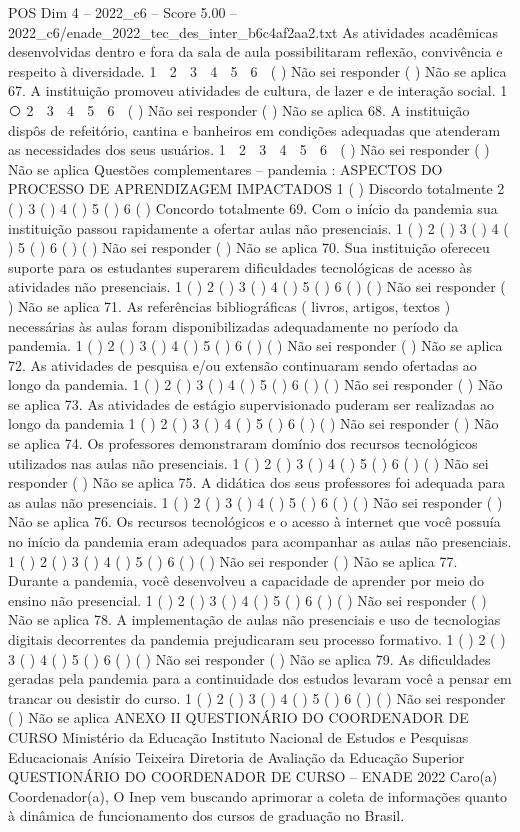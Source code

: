 \begin{textsample}{POS Dim 4 – 2022\_c6 – Score 5.00 – 2022\_c6/enade\_2022\_tec\_des\_inter\_b6c4af2aa2.txt}
As atividades acadêmicas desenvolvidas dentro e fora da sala de aula possibilitaram reflexão, convivência e respeito à diversidade. 1 ⃝ 2 ⃝ 3 ⃝ 4 ⃝ 5 ⃝ 6 ⃝ ( ) Não sei responder ( ) Não se aplica 67.
A instituição promoveu atividades de cultura, de lazer e de interação social. 1 ⃝ 2 ⃝ 3 ⃝ 4 ⃝ 5 ⃝ 6 ⃝ ( ) Não sei responder ( ) Não se aplica 68.
A instituição dispôs de refeitório, cantina e banheiros em condições adequadas que atenderam as necessidades dos seus usuários. 1 ⃝ 2 ⃝ 3 ⃝ 4 ⃝ 5 ⃝ 6 ⃝ ( ) Não sei responder ( ) Não se aplica Questões complementares – pandemia : ASPECTOS DO PROCESSO DE APRENDIZAGEM IMPACTADOS 1 ( ) Discordo totalmente 2 ( ) 3 ( ) 4 ( ) 5 ( ) 6 ( ) Concordo totalmente 69.
Com o início da pandemia sua instituição passou rapidamente a ofertar aulas não presenciais. 1 ( ) 2 ( ) 3 ( ) 4 ( ) 5 ( ) 6 ( ) ( ) Não sei responder ( ) Não se aplica 70.
Sua instituição ofereceu suporte para os estudantes superarem dificuldades tecnológicas de acesso às atividades não presenciais. 1 ( ) 2 ( ) 3 ( ) 4 ( ) 5 ( ) 6 ( ) ( ) Não sei responder ( ) Não se aplica 71.
As referências bibliográficas ( livros, artigos, textos ) necessárias às aulas foram disponibilizadas adequadamente no período da pandemia. 1 ( ) 2 ( ) 3 ( ) 4 ( ) 5 ( ) 6 ( ) ( ) Não sei responder ( ) Não se aplica 72.
As atividades de pesquisa e/ou extensão continuaram sendo ofertadas ao longo da pandemia. 1 ( ) 2 ( ) 3 ( ) 4 ( ) 5 ( ) 6 ( ) ( ) Não sei responder ( ) Não se aplica 73.
As atividades de estágio supervisionado puderam ser realizadas ao longo da pandemia 1 ( ) 2 ( ) 3 ( ) 4 ( ) 5 ( ) 6 ( ) ( ) Não sei responder ( ) Não se aplica 74.
Os professores demonstraram domínio dos recursos tecnológicos utilizados nas aulas não presenciais. 1 ( ) 2 ( ) 3 ( ) 4 ( ) 5 ( ) 6 ( ) ( ) Não sei responder ( ) Não se aplica 75.
A didática dos seus professores foi adequada para as aulas não presenciais. 1 ( ) 2 ( ) 3 ( ) 4 ( ) 5 ( ) 6 ( ) ( ) Não sei responder ( ) Não se aplica 76.
Os recursos tecnológicos e o acesso à internet que você possuía no início da pandemia eram adequados para acompanhar as aulas não presenciais. 1 ( ) 2 ( ) 3 ( ) 4 ( ) 5 ( ) 6 ( ) ( ) Não sei responder ( ) Não se aplica 77.
Durante a pandemia, você desenvolveu a capacidade de aprender por meio do ensino não presencial. 1 ( ) 2 ( ) 3 ( ) 4 ( ) 5 ( ) 6 ( ) ( ) Não sei responder ( ) Não se aplica 78.
A implementação de aulas não presenciais e uso de tecnologias digitais decorrentes da pandemia prejudicaram seu processo formativo. 1 ( ) 2 ( ) 3 ( ) 4 ( ) 5 ( ) 6 ( ) ( ) Não sei responder ( ) Não se aplica 79.
As dificuldades geradas pela pandemia para a continuidade dos estudos levaram você a pensar em trancar ou desistir do curso. 1 ( ) 2 ( ) 3 ( ) 4 ( ) 5 ( ) 6 ( ) ( ) Não sei responder ( ) Não se aplica ANEXO II QUESTIONÁRIO DO COORDENADOR DE CURSO Ministério da Educação Instituto Nacional de Estudos e Pesquisas Educacionais Anísio Teixeira Diretoria de Avaliação da Educação Superior QUESTIONÁRIO DO COORDENADOR DE CURSO – ENADE 2022 Caro(a) Coordenador(a), O Inep vem buscando aprimorar a coleta de informações quanto à dinâmica de funcionamento dos cursos de graduação no Brasil.

\end{textsample}
